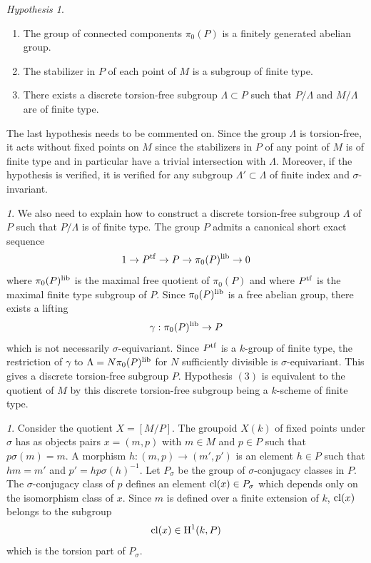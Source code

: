 \documentclass[12pt,english]{smfart}
\numberwithin{equation}{subsection}
\theoremstyle{remark}
\newtheorem{hypothese}[equation]{Hypothesis}
\newtheorem{numero}[equation]{}
\newcommand\rmH{{\rm H}}
\newcommand\cl{{\rm cl}}
\begin{document}
\begin{hypothese}\label{hypothese : finitude}
\begin{enumerate}
 \item The group of connected components $\pi_0(P)$ is a
   finitely generated abelian group.
 \item The stabilizer in $P$ of each point of $M$ is a
   subgroup of finite type.
 \item There exists a discrete torsion-free subgroup $\Lambda \subset P$
   such that $P/ \Lambda$ and $M/ \Lambda$ are of finite type.
\end{enumerate}
\end{hypothese}

The last hypothesis needs to be commented on. Since the
group $\Lambda$ is torsion-free, it acts without fixed points on $M$ since
the stabilizers in $P$ of any point of $M$ is of finite type
and in particular have a trivial intersection with $\Lambda$. Moreover, if
the hypothesis is verified, it is verified for any
subgroup $\Lambda'\subset \Lambda$ of finite index and $\sigma$-invariant.

\begin{numero}
We also need to explain how to construct a discrete torsion-free subgroup
$\Lambda$ of $P$ such that $P/ \Lambda$ is of finite type. The group
$P$ admits a canonical short exact sequence
$$1\rightarrow P^{\rm tf} \rightarrow P \rightarrow \pi_0(P)^{\rm lib} \rightarrow 0$$
where $\pi_0(P)^{\rm lib}$ is the maximal free quotient of $\pi_0(P)$ and
where $P^{\rm tf}$ is the maximal finite type subgroup of $P$. Since
$\pi_0(P)^{\rm lib}$ is a free abelian group, there exists a lifting
$$\gamma:\pi_0(P)^{\rm lib} \rightarrow P$$
which is not necessarily $\sigma$-equivariant. Since $P^{\rm tf}$
is a $k$-group of finite type, the restriction of $\gamma$ to
$\Lambda=N\pi_0(P)^{\rm lib}$ for $N$ sufficiently divisible is
$\sigma$-equivariant. This gives a discrete torsion-free subgroup
$P$. Hypothesis $(3)$ is equivalent to the quotient of $M$
by this discrete torsion-free subgroup being a $k$-scheme of finite type.
\end{numero}

\begin{numero}
Consider the quotient $X=[M/ P]$. The groupoid $X(k)$ of fixed points
under $\sigma$ has as objects pairs $x=(m,p)$ with $m\in M$ and $p\in P$
such that $p\sigma(m)=m$. A morphism $h:(m,p)\rightarrow (m',p')$ is an
element $h\in P$ such that $hm=m'$ and $p'=hp\sigma(h)^{-1}$. Let
$P_\sigma$ be the group of $\sigma$-conjugacy classes in $P$. The
$\sigma$-conjugacy class of $p$ defines an element $\cl(x)\in
P_\sigma$ which depends only on the isomorphism class of $x$. Since
$m$ is defined over a finite extension of $k$, $\cl(x)$ belongs to the
subgroup
$$\cl(x)\in \rmH^1(k,P)$$
which is the torsion part of $P_\sigma$.
\end{numero}
\end{document}
